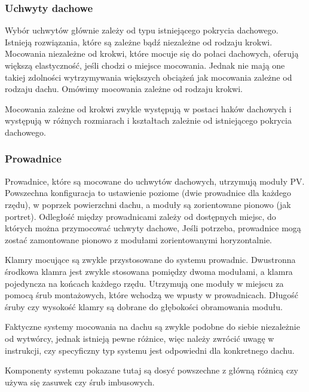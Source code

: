 \documentclass[12pt,a4paper]{article}
\begin{document}
 

\subsubsection{Uchwyty dachowe}


Wybór uchwytów głównie zależy od typu istniejącego pokrycia dachowego. 
Istnieją rozwiązania, które są zależne bądź niezależne od rodzaju 
krokwi. Mocowania niezależne od krokwi, które mocuje się do połaci 
dachowych, oferują większą elastyczność, jeśli chodzi o miejsce 
mocowania. Jednak nie mają one takiej zdolności wytrzymywania większych 
obciążeń jak mocowania zależne od rodzaju dachu. Omówimy mocowania 
zależne od rodzaju krokwi. 

Mocowania zależne od krokwi zwykle występują w postaci haków dachowych i 
występują w różnych rozmiarach i kształtach zależnie od istniejącego 
pokrycia dachowego. 

 

\subsubsection{Prowadnice }


Prowadnice, które są mocowane do uchwytów dachowych, utrzymują moduły 
PV. Powszechna konfiguracja to ustawienie poziome (dwie prowadnice dla 
każdego rzędu), w poprzek powierzchni dachu, a moduły są zorientowane 
pionowo (jak portret). Odległość między prowadnicami zależy od 
dostępnych miejsc, do których można przymocować uchwyty dachowe, Jeśli 
potrzeba, prowadnice mogą zostać zamontowane pionowo z modułami 
zorientowanymi horyzontalnie. 

Klamry mocujące są zwykle przystosowane do systemu prowadnic. Dwustronna 
środkowa klamra jest zwykle stosowana pomiędzy dwoma modułami, a klamra 
pojedyncza na końcach każdego rzędu. Utrzymują one moduły w miejscu za 
pomocą śrub montażowych, które wchodzą we wpusty w prowadnicach. Długość 
śruby czy wysokość klamry są dobrane do głębokości obramowania modułu. 

 

Faktyczne systemy mocowania na dachu są zwykle podobne do siebie 
niezależnie od wytwórcy, jednak istnieją pewne różnice, więc należy 
zwrócić uwagę w instrukcji, czy specyficzny typ systemu jest odpowiedni 
dla konkretnego dachu. 

 

Komponenty systemu pokazane tutaj są dosyć powszechne z główną różnicą 
czy używa się zasuwek czy śrub imbusowych. 
\end{document}
